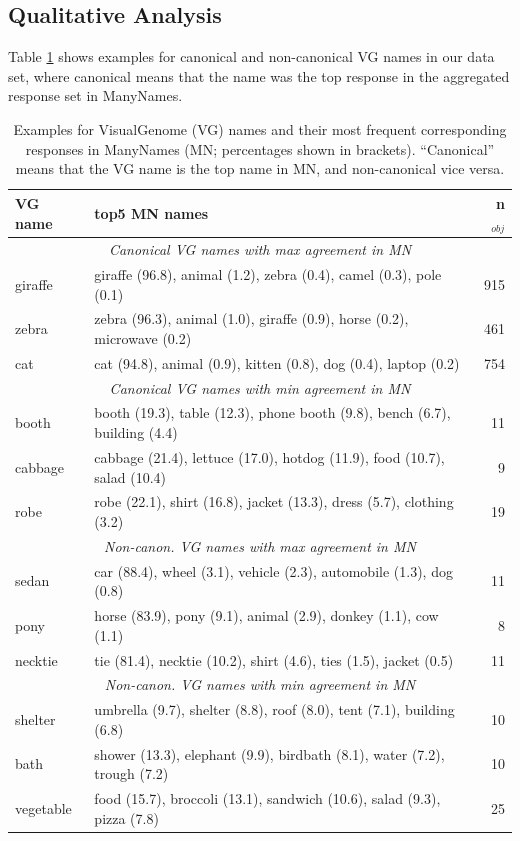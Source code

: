 \subsection{Qualitative Analysis}

 Table \ref{tab:qual} shows examples for canonical and non-canonical VG names in our data set, where canonical means that the name was the top response in the aggregated response set in ManyNames.

\begin{table}
\small
\begin{tabular}{lp{4.8cm}r}
\toprule
VG name &  top5 MN names &  n$_{obj}$  \\
\midrule
\multicolumn{3}{c}{\it Canonical VG names with max agreement in MN}\\
 giraffe &  giraffe (96.8), animal (1.2), zebra (0.4), camel (0.3), pole (0.1) &  915 \\
 zebra &  zebra (96.3), animal (1.0), giraffe (0.9), horse (0.2), microwave (0.2) &  461  \\
 cat &  cat (94.8), animal (0.9), kitten (0.8), dog (0.4), laptop (0.2) &  754\\
\midrule
\multicolumn{3}{c}{\it Canonical VG names with min agreement in MN}\\
 booth &  booth (19.3), table (12.3), phone booth (9.8), bench (6.7), building (4.4) &  11 \\
 cabbage &  cabbage (21.4), lettuce (17.0), hotdog (11.9), food (10.7), salad (10.4) &  9 \\
 robe &  robe (22.1), shirt (16.8), jacket (13.3), dress (5.7), clothing (3.2) &  19 \\
  \midrule
  \multicolumn{3}{c}{\it Non-canon. VG names with max agreement in MN}\\
 sedan &  car (88.4), wheel (3.1), vehicle (2.3), automobile (1.3), dog (0.8) &  11 \\
 pony &  horse (83.9), pony (9.1), animal (2.9), donkey (1.1), cow (1.1) &  8 \\
 necktie &  tie (81.4), necktie (10.2), shirt (4.6), ties (1.5), jacket (0.5) &  11 \\
 \midrule
   \multicolumn{3}{c}{\it Non-canon. VG names with min agreement in MN}\\
 shelter &  umbrella (9.7), shelter (8.8), roof (8.0), tent (7.1), building (6.8) &  10 \\
 bath &  shower (13.3), elephant (9.9), birdbath (8.1), water (7.2), trough (7.2) &  10 \\
 vegetable &  food (15.7), broccoli (13.1), sandwich (10.6), salad (9.3), pizza (7.8) &  25 \\
\bottomrule
\end{tabular}
\caption{Examples for VisualGenome (VG) names and their most frequent corresponding responses in ManyNames (MN; percentages shown in brackets). ``Canonical'' means that the VG name is the top name in MN, and non-canonical vice versa.}
\label{tab:qual}
\end{table}


